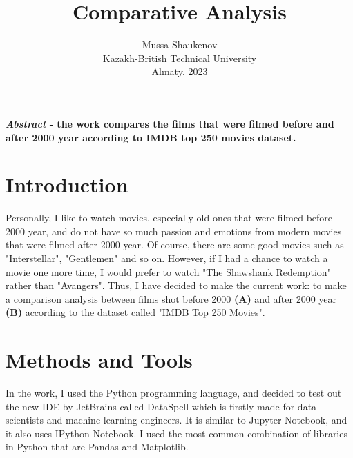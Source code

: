 \documentclass[10pt]{article}
\begin{document}
\title{\textbf{Comparative Analysis}}
\author{
         {Mussa Shaukenov} \\
         {\small Kazakh-British Technical University} \\ 
         {\small Almaty, 2023}
    }
\date{}

\maketitle

\begin{multicols}{2}
\noindent \footnotesize \textbf{\textit{Abstract} - the work compares the films that were filmed before and after 2000 year according to IMDB top 250 movies dataset.
    }
    
\section*{\centering \normalsize  Introduction}
    \footnotesize{
        Personally, I like to watch movies, especially old ones that were filmed before 2000 year, and do 
        not have so much passion and emotions from modern movies that were filmed after 2000 year. 
        Of course, there are some good movies such as "Interstellar", "Gentlemen" and so on. 
        However, if I had a chance to watch a movie one more time, I would prefer to watch "The Shawshank Redemption" rather than "Avangers".
        Thus, I have decided to make the current work: to make a comparison analysis between
        films shot before 2000 \textbf{(A)} and after 2000 year \textbf{(B)} according to the dataset called "IMDB Top 250 Movies".
    }

\section*{\centering \normalsize  Methods and Tools}
    \footnotesize{
        In the work, I used the Python programming language, and decided to test out the new IDE by JetBrains called DataSpell which is firstly made for data scientists and machine learning engineers.
        It is similar to Jupyter Notebook, and it also uses IPython Notebook. I used the most common combination of libraries in Python that are Pandas and Matplotlib.
    }


\end{multicols}
\end{document}

